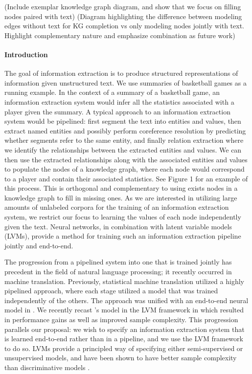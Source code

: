 \documentclass[11pt]{article}
\begin{document}
(Include exemplar knowledge graph diagram, and show that we focus on filling nodes paired with text)
(Diagram highlighting the difference between modeling edges without text for KG completion
vs only modeling nodes jointly with text. Highlight complementary nature and emphasize
combination as future work)

\paragraph{Introduction}
The goal of information extraction is to produce structured representations of information
given unstructured text.
We use summaries of basketball games as a running example.
In the context of a summary of a basketball game, an information extraction system
would infer all the statistics associated with a player given the summary.
A typical approach to an information extraction system would be pipelined:
first segment the text into entities and values,
then extract named entities and possibly perform
coreference resolution by predicting whether segments refer to the same entity, 
and finally relation extraction where we identify the relationships between the extracted
entities and values.
We can then use the extracted relationships along with the associated entities and values
to populate the nodes of a knowledge graph, where each node would
correspond to a player and contain their associated statistics.
See Figure 1 for an example of this process.
This is orthogonal and complementary to using exists nodes in a knowledge graph
to fill in missing ones.
As we are interested in utilizing large amounts of unlabeled corpora for 
the training of an information extraction system, we restrict our focus
to learning the values of each node independently given the text.
Neural networks, in combination with latent variable models (LVMs),
provide a method for training such an information extraction pipeline jointly
and end-to-end.

The progression from a pipelined system into one that is trained jointly
has precedent in the field of natural language processing;
it recently occurred in machine translation.
Previously, statistical machine translation utilized a highly pipelined approach,
where each stage utilized a model that was trained independently of the others.
The approach was unified with an end-to-end neural model in \citet{bahdanau2014mt}.
We recently recast \citet{bahdanau2014mt}'s model in the LVM framework in
\citet{deng2018attn} which resulted in performance gains as well as improved
sample complexity.
This progression parallels our proposal: we wish to specify an information
extraction system that is learned end-to-end rather than in a pipeline,
and we use the LVM framework to do so.
LVMs provide a principled way of specifying either semi-supervised or unsupervised models,
and have been shown to have better sample complexity than discriminative models
\citep{deng2018attn,ng2001discgen}.
\end{document}
